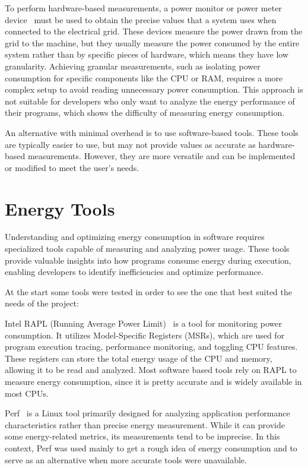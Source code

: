 To perform hardware-based measurements, a power monitor or power meter device~\cite{hackenberg2013power,ge2009powerpack} must be used to obtain the precise values that a system uses when connected to the electrical grid. These devices measure the power drawn from the grid to the machine, but they usually measure the power consumed by the entire system rather than by specific pieces of hardware, which means they have low granularity. Achieving granular measurements, such as isolating power consumption for specific components like the CPU or RAM, requires a more complex setup to avoid reading unnecessary power consumption. This approach is not suitable for developers who only want to analyze the energy performance of their programs, which shows the difficulty of measuring energy consumption.

An alternative with minimal overhead is to use software-based tools. These tools are typically easier to use, but may not provide values as accurate as hardware-based measurements. However, they are more versatile and can be implemented or modified to meet the user's needs. 


\section{Energy Tools} \label{sec:background_energy}

Understanding and optimizing energy consumption in software requires specialized tools capable of measuring and analyzing power usage. These tools provide valuable insights into how programs consume energy during execution, enabling developers to identify inefficiencies and optimize performance.

At the start some tools were tested in order to see the one that best suited the needs of the project:

Intel RAPL (Running Average Power Limit)~\cite{intel_rapl} is a tool for monitoring power consumption. It utilizes Model-Specific Registers (MSRs), which are used for program execution tracing, performance monitoring, and toggling CPU features. These registers can store the total energy usage of the CPU and memory, allowing it to be read and analyzed. Most software based tools rely on RAPL to measure energy consumption, since it is pretty accurate and is widely available in most CPUs.


Perf~\cite{perfwiki_main} is a Linux tool primarily designed for analyzing application performance characteristics rather than precise energy measurement. While it can provide some energy-related metrics, its measurements tend to be imprecise. In this context, Perf was used mainly to get a rough idea of energy consumption and to serve as an alternative when more accurate tools were unavailable.

